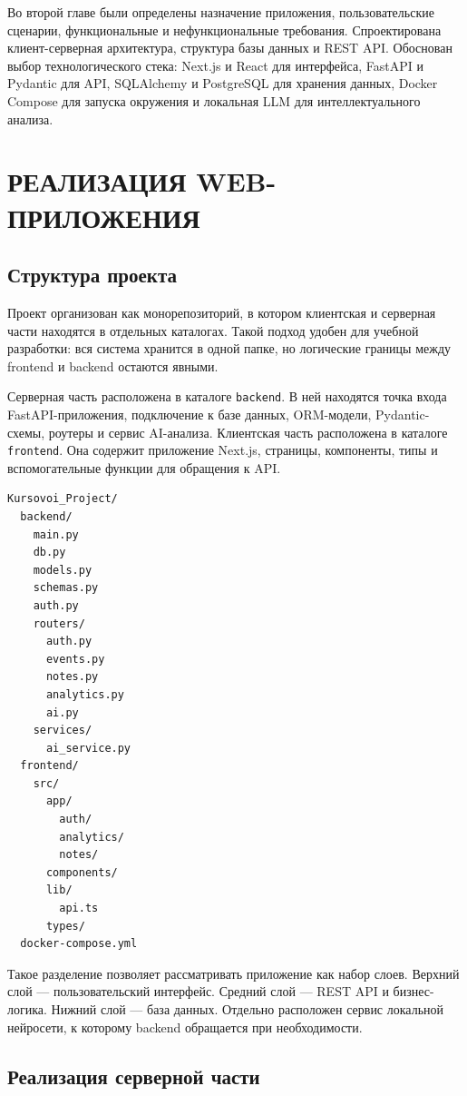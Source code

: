 \documentclass[14pt,a4paper]{extreport}
\begin{document}
Во второй главе были определены назначение приложения, пользовательские сценарии, функциональные и нефункциональные требования. Спроектирована клиент-серверная архитектура, структура базы данных и REST API. Обоснован выбор технологического стека: Next.js и React для интерфейса, FastAPI и Pydantic для API, SQLAlchemy и PostgreSQL для хранения данных, Docker Compose для запуска окружения и локальная LLM для интеллектуального анализа.

\chapter{РЕАЛИЗАЦИЯ WEB-ПРИЛОЖЕНИЯ}

\section{Структура проекта}

Проект организован как монорепозиторий, в котором клиентская и серверная части находятся в отдельных каталогах. Такой подход удобен для учебной разработки: вся система хранится в одной папке, но логические границы между frontend и backend остаются явными.

Серверная часть расположена в каталоге \texttt{backend}. В ней находятся точка входа FastAPI-приложения, подключение к базе данных, ORM-модели, Pydantic-схемы, роутеры и сервис AI-анализа. Клиентская часть расположена в каталоге \texttt{frontend}. Она содержит приложение Next.js, страницы, компоненты, типы и вспомогательные функции для обращения к API.

\begin{Verbatim}[fontsize=\small]
Kursovoi_Project/
  backend/
    main.py
    db.py
    models.py
    schemas.py
    auth.py
    routers/
      auth.py
      events.py
      notes.py
      analytics.py
      ai.py
    services/
      ai_service.py
  frontend/
    src/
      app/
        auth/
        analytics/
        notes/
      components/
      lib/
        api.ts
      types/
  docker-compose.yml
\end{Verbatim}

Такое разделение позволяет рассматривать приложение как набор слоев. Верхний слой --- пользовательский интерфейс. Средний слой --- REST API и бизнес-логика. Нижний слой --- база данных. Отдельно расположен сервис локальной нейросети, к которому backend обращается при необходимости.

\section{Реализация серверной части}
\end{document}
